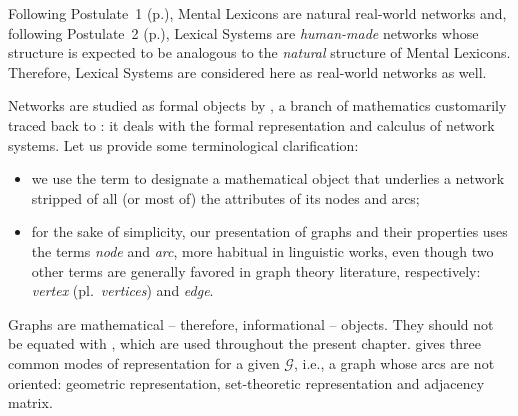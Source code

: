 \label{txt:LSRealWorldNetwork}\begin{soundboxnotitle}
Following Postulate~1 (p.\thinspace\pageref{txt:postulateStrucLexicons}), Mental Lexicons are natural real-world networks and, following Postulate~2 (p.\thinspace\pageref{txt:postulateStrucLS}), Lexical Systems are \emph{human-made} networks whose structure is expected to be analogous to the \emph{natural} structure of Mental Lexicons. Therefore, Lexical Systems are considered here as real-world networks as well.
\end{soundboxnotitle}

Networks are studied as formal objects by , a branch of mathematics customarily traced back to \textcite{Euler1741}: it deals with the formal representation and calculus of network systems. Let us provide some terminological clarification:

\begin{itemize}

\item we use the term  to designate a mathematical object that underlies a network stripped of all (or most of) the attributes of its nodes and arcs;

\item for the sake of simplicity, our presentation of graphs and their properties uses the terms \textit{node} and \textit{arc}, more habitual in linguistic works, even though two other terms are generally favored in graph theory literature, respectively: \textit{vertex} (pl.~\textit{vertices}) and \textit{edge}. 

\end{itemize}


Graphs are mathematical -- therefore, informational -- objects. They should not be equated with , which are used throughout the present chapter.  gives three common modes of representation for a given  $\mathcal{G}$, i.e., a graph whose arcs are not oriented: geometric representation, set-theoretic representation and adjacency matrix.

